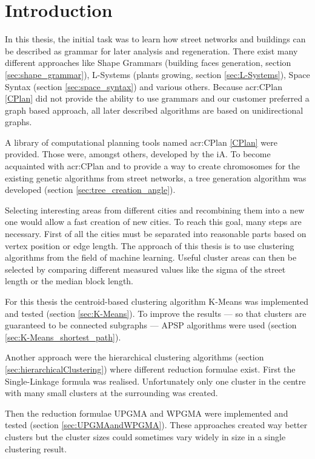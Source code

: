 \chapter{Introduction}
In this thesis, the initial task was to learn how street networks and buildings can be described as grammar for later analysis and regeneration. There exist many different approaches like Shape Grammars (building faces generation, section \ref{sec:shape_grammar}), L-Systems (plants growing, section \ref{sec:L-Systems}), Space Syntax (section \ref{sec:space_syntax}) and various others. Because \acrshort{acr:CPlan} \ref{CPlan} did not provide the ability to use grammars and our customer preferred a graph based approach, all later described algorithms are based on unidirectional graphs.

A library of computational planning tools named \acrshort{acr:CPlan} \ref{CPlan} were provided. Those were, amongst others, developed by the \gls{iA}. To become acquainted with \acrshort{acr:CPlan} and to provide a way to create chromosomes for the existing genetic algorithms from street networks, a tree generation algorithm was developed (section \ref{sec:tree_creation_angle}).

Selecting interesting areas from different cities and recombining them into a new one would allow a fast creation of new cities. To reach this goal, many steps are necessary. First of all the cities must be separated into reasonable parts based on vertex position or edge length. The approach of this thesis is to use clustering algorithms from the field of machine learning. Useful cluster areas can then be selected by comparing different measured values like the sigma of the street length or the median block length.

For this thesis the centroid-based clustering algorithm K-Means was implemented and tested (section \ref{sec:K-Means}). To improve the results --- so that clusters are guaranteed to be connected subgraphs --- \gls{APSP} algorithms were used (section \ref{sec:K-Means_shortest_path}).

Another approach were the hierarchical clustering algorithms (section \ref{sec:hierarchicalClustering}) where different reduction formulae exist. First the Single-Linkage formula was realised. Unfortunately only one cluster in the centre with many small clusters at the surrounding was created.

\newpage

Then the reduction formulae \gls{UPGMA} and \gls{WPGMA} were implemented and tested (section \ref{sec:UPGMAandWPGMA}). These approaches created way better clusters but the cluster sizes could sometimes vary widely in size in a single clustering result.

